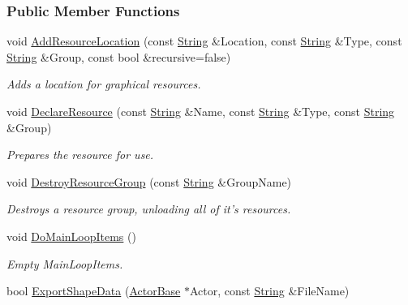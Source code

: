 \subsubsection*{Public Member Functions}
\begin{DoxyCompactItemize}
\item 
void \hyperlink{classphys_1_1ResourceManager_a0d7d3adce2ad4c70a3e867396e17b090}{AddResourceLocation} (const \hyperlink{namespacephys_aa03900411993de7fbfec4789bc1d392e}{String} \&Location, const \hyperlink{namespacephys_aa03900411993de7fbfec4789bc1d392e}{String} \&Type, const \hyperlink{namespacephys_aa03900411993de7fbfec4789bc1d392e}{String} \&Group, const bool \&recursive=false)
\begin{DoxyCompactList}\small\item\em Adds a location for graphical resources. \item\end{DoxyCompactList}\item 
void \hyperlink{classphys_1_1ResourceManager_a6ac7835a02dff32e60a73320f9c9dabb}{DeclareResource} (const \hyperlink{namespacephys_aa03900411993de7fbfec4789bc1d392e}{String} \&Name, const \hyperlink{namespacephys_aa03900411993de7fbfec4789bc1d392e}{String} \&Type, const \hyperlink{namespacephys_aa03900411993de7fbfec4789bc1d392e}{String} \&Group)
\begin{DoxyCompactList}\small\item\em Prepares the resource for use. \item\end{DoxyCompactList}\item 
void \hyperlink{classphys_1_1ResourceManager_afa5d686ad3b4c863580050994169cb6b}{DestroyResourceGroup} (const \hyperlink{namespacephys_aa03900411993de7fbfec4789bc1d392e}{String} \&GroupName)
\begin{DoxyCompactList}\small\item\em Destroys a resource group, unloading all of it's resources. \item\end{DoxyCompactList}\item 
void \hyperlink{classphys_1_1ResourceManager_a2114714999441c095bc28d3673c2490e}{DoMainLoopItems} ()
\begin{DoxyCompactList}\small\item\em Empty MainLoopItems. \item\end{DoxyCompactList}\item 
bool \hyperlink{classphys_1_1ResourceManager_a9511ec29e5c732602b1495173abf56ef}{ExportShapeData} (\hyperlink{classphys_1_1ActorBase}{ActorBase} $\ast$Actor, const \hyperlink{namespacephys_aa03900411993de7fbfec4789bc1d392e}{String} \&FileName)

\end{DoxyCompactItemize}
